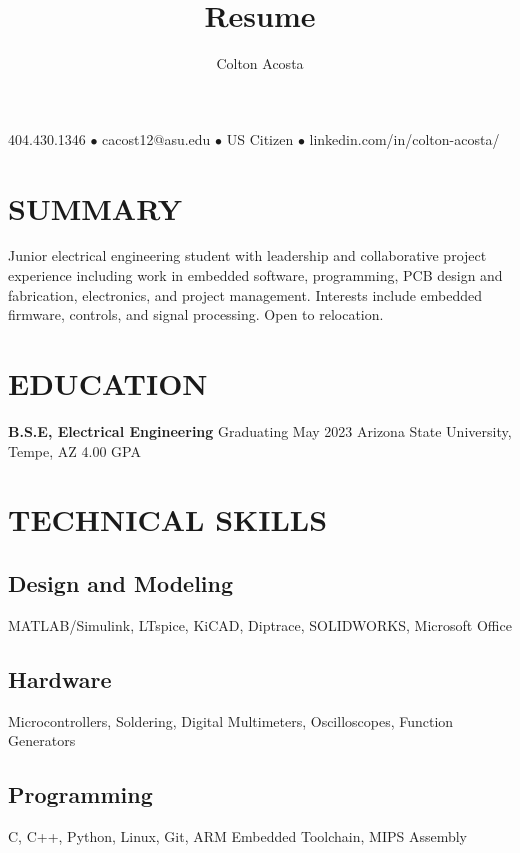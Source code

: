 \documentclass{article}
\makeatletter
\renewcommand{\maketitle}{
	\begin{center}
		{\huge\bfseries
			\theauthor}
			
		404.430.1346 $\bullet$ cacost12@asu.edu $\bullet$ US Citizen $\bullet$ linkedin.com/in/colton-acosta/
	\end{center}
}
\makeatother
\begin{document}
\title{Resume}
\author{Colton Acosta}
\maketitle
\section{SUMMARY}
Junior electrical engineering student with leadership and collaborative project  experience including work in embedded software, programming, PCB design and fabrication, electronics, and project management. Interests include embedded firmware, controls, and signal processing. Open to relocation.
\section{EDUCATION}
\textbf{B.S.E, Electrical Engineering}
\hfill 
Graduating May 2023
\linebreak
Arizona State University, Tempe, AZ 
\hfill
4.00 GPA

\section{TECHNICAL SKILLS}
\subsection{Design and Modeling}
MATLAB/Simulink, LTspice, KiCAD, Diptrace, SOLIDWORKS, Microsoft Office
\subsection{Hardware}
Microcontrollers, Soldering, Digital Multimeters, Oscilloscopes, Function Generators
\subsection{Programming} 
C, C++, Python, Linux, Git, ARM Embedded Toolchain, MIPS Assembly
\end{document}

